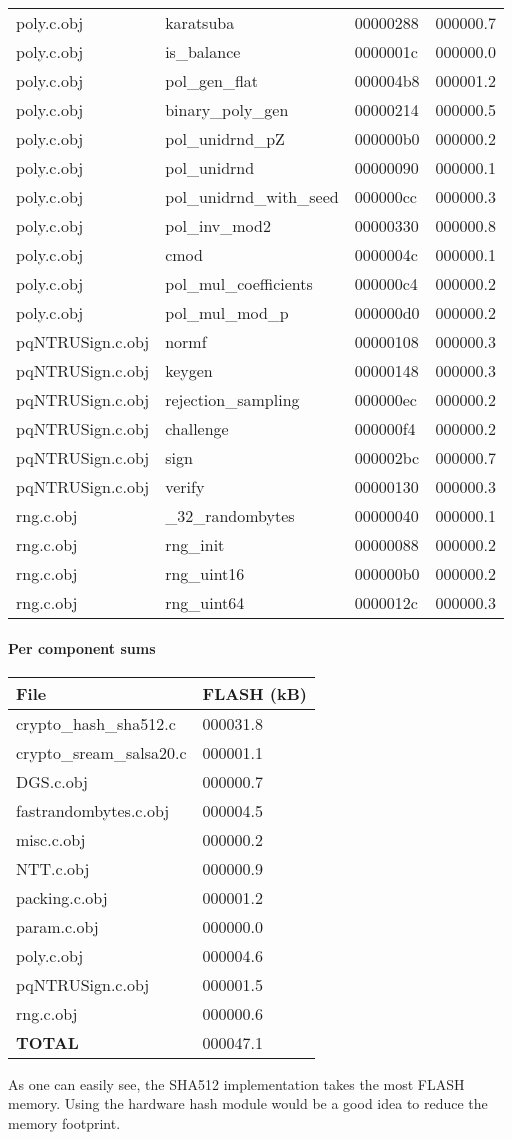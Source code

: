 \documentclass[
]{article}
\begin{document}
\begin{longtable}[]{@{}llll@{}}
poly.c.obj & karatsuba & 00000288 & 000000.7\tabularnewline
poly.c.obj & is\_balance & 0000001c & 000000.0\tabularnewline
poly.c.obj & pol\_gen\_flat & 000004b8 & 000001.2\tabularnewline
poly.c.obj & binary\_poly\_gen & 00000214 & 000000.5\tabularnewline
poly.c.obj & pol\_unidrnd\_pZ & 000000b0 & 000000.2\tabularnewline
poly.c.obj & pol\_unidrnd & 00000090 & 000000.1\tabularnewline
poly.c.obj & pol\_unidrnd\_with\_seed & 000000cc &
000000.3\tabularnewline
poly.c.obj & pol\_inv\_mod2 & 00000330 & 000000.8\tabularnewline
poly.c.obj & cmod & 0000004c & 000000.1\tabularnewline
poly.c.obj & pol\_mul\_coefficients & 000000c4 & 000000.2\tabularnewline
poly.c.obj & pol\_mul\_mod\_p & 000000d0 & 000000.2\tabularnewline
pqNTRUSign.c.obj & normf & 00000108 & 000000.3\tabularnewline
pqNTRUSign.c.obj & keygen & 00000148 & 000000.3\tabularnewline
pqNTRUSign.c.obj & rejection\_sampling & 000000ec &
000000.2\tabularnewline
pqNTRUSign.c.obj & challenge & 000000f4 & 000000.2\tabularnewline
pqNTRUSign.c.obj & sign & 000002bc & 000000.7\tabularnewline
pqNTRUSign.c.obj & verify & 00000130 & 000000.3\tabularnewline
rng.c.obj & \_32\_randombytes & 00000040 & 000000.1\tabularnewline
rng.c.obj & rng\_init & 00000088 & 000000.2\tabularnewline
rng.c.obj & rng\_uint16 & 000000b0 & 000000.2\tabularnewline
rng.c.obj & rng\_uint64 & 0000012c & 000000.3\tabularnewline
\bottomrule
\end{longtable}

\hypertarget{per-component-sums}{%
\paragraph{Per component sums}\label{per-component-sums}}

\begin{longtable}[]{@{}ll@{}}
\toprule
File & FLASH (kB)\tabularnewline
\midrule
\endhead
crypto\_hash\_sha512.c & 000031.8\tabularnewline
crypto\_sream\_salsa20.c & 000001.1\tabularnewline
DGS.c.obj & 000000.7\tabularnewline
fastrandombytes.c.obj & 000004.5\tabularnewline
misc.c.obj & 000000.2\tabularnewline
NTT.c.obj & 000000.9\tabularnewline
packing.c.obj & 000001.2\tabularnewline
param.c.obj & 000000.0\tabularnewline
poly.c.obj & 000004.6\tabularnewline
pqNTRUSign.c.obj & 000001.5\tabularnewline
rng.c.obj & 000000.6\tabularnewline
\textbf{TOTAL} & 000047.1\tabularnewline
\bottomrule
\end{longtable}

As one can easily see, the SHA512 implementation takes the most FLASH
memory. Using the hardware hash module would be a good idea to reduce
the memory footprint.
\end{document}

